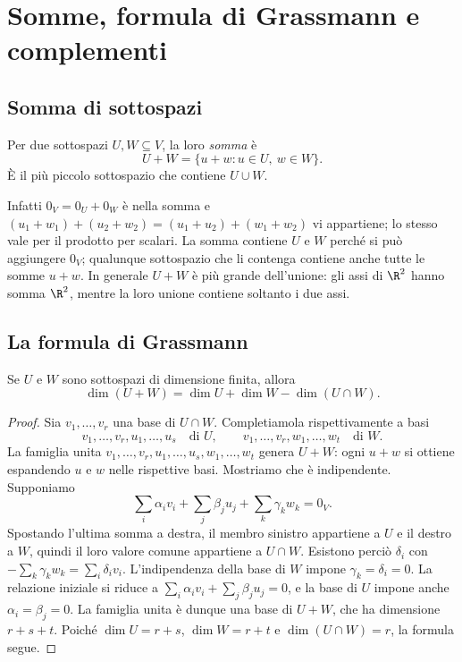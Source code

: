 \chapter{Somme, formula di Grassmann e complementi}

\section{Somma di sottospazi}
\begin{definizione}
Per due sottospazi $U,W\subseteq V$, la loro \emph{somma} è
\[
U+W=\{u+w:u\in U,\ w\in W\}.
\]
È il più piccolo sottospazio che contiene $U\cup W$.
\end{definizione}
Infatti $0_V=0_U+0_W$ è nella somma e
$(u_1+w_1)+(u_2+w_2)=(u_1+u_2)+(w_1+w_2)$ vi appartiene;
lo stesso vale per il prodotto per scalari. La somma contiene
$U$ e $W$ perché si può aggiungere $0_V$; qualunque sottospazio
che li contenga contiene anche tutte le somme $u+w$. In generale
$U+W$ è più grande dell'unione: gli assi di $\R^2$ hanno somma
$\R^2$, mentre la loro unione contiene soltanto i due assi.

\section{La formula di Grassmann}
\begin{teorema}
Se $U$ e $W$ sono sottospazi di dimensione finita, allora
\[
\dim(U+W)=\dim U+\dim W-\dim(U\cap W).
\]
\end{teorema}
\begin{proof}
Sia $v_1,\ldots,v_r$ una base di $U\cap W$. Completiamola
rispettivamente a basi
\[
v_1,\ldots,v_r,u_1,\ldots,u_s\quad\text{di }U,
\qquad
v_1,\ldots,v_r,w_1,\ldots,w_t\quad\text{di }W.
\]
La famiglia unita
$v_1,\ldots,v_r,u_1,\ldots,u_s,w_1,\ldots,w_t$
genera $U+W$: ogni $u+w$ si ottiene espandendo $u$ e $w$ nelle
rispettive basi. Mostriamo che è indipendente. Supponiamo
\[
\sum_i\alpha_i v_i+\sum_j\beta_j u_j+
\sum_k\gamma_k w_k=0_V.
\]
Spostando l'ultima somma a destra, il membro sinistro appartiene
a $U$ e il destro a $W$, quindi il loro valore comune appartiene
a $U\cap W$. Esistono perciò $\delta_i$ con
$-\sum_k\gamma_k w_k=\sum_i\delta_i v_i$. L'indipendenza della
base di $W$ impone $\gamma_k=\delta_i=0$. La relazione iniziale
si riduce a $\sum_i\alpha_i v_i+\sum_j\beta_j u_j=0$, e la base
di $U$ impone anche $\alpha_i=\beta_j=0$.
La famiglia unita è dunque una base di $U+W$, che ha dimensione
$r+s+t$. Poiché $\dim U=r+s$, $\dim W=r+t$ e
$\dim(U\cap W)=r$, la formula segue.
\end{proof}

